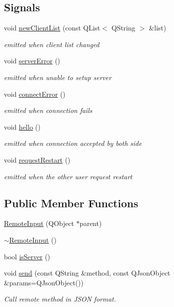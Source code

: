 \subsection*{Signals}
\begin{DoxyCompactItemize}
\item 
void \hyperlink{classRemoteInput_a03854b31b3bd34a0c6714e34ea97fa51}{new\+Client\+List} (const Q\+List$<$ Q\+String $>$ \&list)
\begin{DoxyCompactList}\small\item\em emitted when client list changed \end{DoxyCompactList}\item 
void \hyperlink{classRemoteInput_a220a9df96569060dbaa459e4260ba5ac}{server\+Error} ()
\begin{DoxyCompactList}\small\item\em emitted when unable to setup server \end{DoxyCompactList}\item 
void \hyperlink{classRemoteInput_ace137f88c2ecb10d206282be259be88b}{connect\+Error} ()
\begin{DoxyCompactList}\small\item\em emitted when connection fails \end{DoxyCompactList}\item 
void \hyperlink{classRemoteInput_addd302fec13370bfc6818d5915844973}{hello} ()
\begin{DoxyCompactList}\small\item\em emitted when connection accepted by both side \end{DoxyCompactList}\item 
void \hyperlink{classRemoteInput_a9e8cb56fd11439e6bc12dd369d7ec4d1}{request\+Restart} ()
\begin{DoxyCompactList}\small\item\em emitted when the other user request restart \end{DoxyCompactList}\end{DoxyCompactItemize}
\subsection*{Public Member Functions}
\begin{DoxyCompactItemize}
\item 
\hyperlink{classRemoteInput_a7d80d0cdef9461614408a40dcc86536d}{Remote\+Input} (Q\+Object $\ast$parent)
\item 
\hyperlink{classRemoteInput_afa5a81b65b2cb9063263094492bbfcb0}{$\sim$\+Remote\+Input} ()
\item 
bool \hyperlink{classRemoteInput_ad4282349a4e2f17e277a5cde678fd295}{is\+Server} ()
\item 
void \hyperlink{classRemoteInput_aef618974f5cad6637ddce434dae2bcf2}{send} (const Q\+String \&method, const Q\+Json\+Object \&params=Q\+Json\+Object())
\begin{DoxyCompactList}\small\item\em Call remote method in J\+S\+ON format. \end{DoxyCompactList}\end{DoxyCompactItemize}
